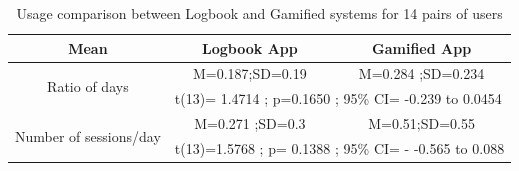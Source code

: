 \newline 
\begin{table}[h!]

  \begin{center}
    \caption{Usage comparison between Logbook and Gamified systems for 14 pairs of users}
    \label{table:usagewellness1}
	\begin{tabular}{|c|c|c|}
		\hline
		Mean &Logbook App&Gamified App\\
		\hline
		 \multirow{2}{*}{Ratio of days}&M=0.187;SD=0.19&M=0.284 ;SD=0.234\\\cline{2-3} 

		 &\multicolumn{2}{|l|}{t(13)= 1.4714 ; p=0.1650 ; 95\% CI=  -0.239 to 0.0454 } \\
\hline
   		 \multirow{2}{*}{ Number of sessions/day}&M=0.271 ;SD=0.3&M=0.51;SD=0.55\\\cline{2-3} 
		
		 &\multicolumn{2}{|l|}{t(13)=1.5768 ; p= 0.1388 ; 95\% CI= - -0.565 to 0.088} \\
\hline

	\end{tabular}
  \end{center}
\end{table}
\newline  
 
